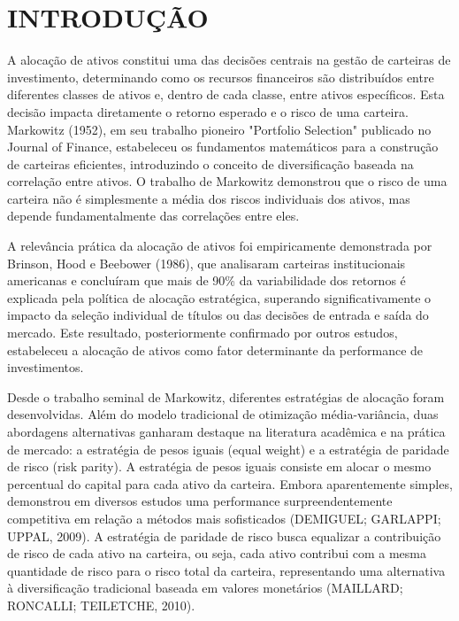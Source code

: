 
\pagestyle{fancy}

\chapter{INTRODUÇÃO}

A alocação de ativos constitui uma das decisões centrais na gestão de carteiras de investimento, determinando como os recursos financeiros são distribuídos entre diferentes classes de ativos e, dentro de cada classe, entre ativos específicos. Esta decisão impacta diretamente o retorno esperado e o risco de uma carteira. Markowitz (1952), em seu trabalho pioneiro "Portfolio Selection" publicado no Journal of Finance, estabeleceu os fundamentos matemáticos para a construção de carteiras eficientes, introduzindo o conceito de diversificação baseada na correlação entre ativos. O trabalho de Markowitz demonstrou que o risco de uma carteira não é simplesmente a média dos riscos individuais dos ativos, mas depende fundamentalmente das correlações entre eles.

A relevância prática da alocação de ativos foi empiricamente demonstrada por Brinson, Hood e Beebower (1986), que analisaram carteiras institucionais americanas e concluíram que mais de 90\% da variabilidade dos retornos é explicada pela política de alocação estratégica, superando significativamente o impacto da seleção individual de títulos ou das decisões de entrada e saída do mercado. Este resultado, posteriormente confirmado por outros estudos, estabeleceu a alocação de ativos como fator determinante da performance de investimentos.

Desde o trabalho seminal de Markowitz, diferentes estratégias de alocação foram desenvolvidas. Além do modelo tradicional de otimização média-variância, duas abordagens alternativas ganharam destaque na literatura acadêmica e na prática de mercado: a estratégia de pesos iguais (equal weight) e a estratégia de paridade de risco (risk parity). A estratégia de pesos iguais consiste em alocar o mesmo percentual do capital para cada ativo da carteira. Embora aparentemente simples, demonstrou em diversos estudos uma performance surpreendentemente competitiva em relação a métodos mais sofisticados (DEMIGUEL; GARLAPPI; UPPAL, 2009). A estratégia de paridade de risco busca equalizar a contribuição de risco de cada ativo na carteira, ou seja, cada ativo contribui com a mesma quantidade de risco para o risco total da carteira, representando uma alternativa à diversificação tradicional baseada em valores monetários (MAILLARD; RONCALLI; TEILETCHE, 2010).

